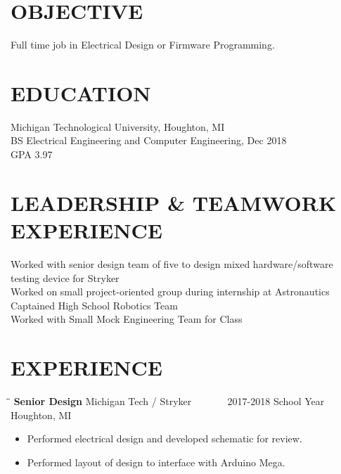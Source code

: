 \documentclass[letterpaper]{res}
\begin{document}
 


\address{\bf CONTACT \\ jaevanko@mtu.edu \\ (269) 262-6098}
\address{\bf ADDRESS \\ 14200 Stone Jug Road \\  Battle Creek, MI 49015}

\begin{resume}

  \section{OBJECTIVE}          
  Full time job in Electrical Design or Firmware Programming.

  \section{EDUCATION}          
  Michigan Technological University, Houghton, MI  \\        
  BS Electrical Engineering and Computer Engineering, Dec 2018   \\      
  GPA 3.97

  \section{LEADERSHIP \& TEAMWORK EXPERIENCE}
  Worked with senior design team of five to design mixed hardware/software testing device for Stryker \\
  Worked on small project-oriented group during internship at Astronautics \\
  Captained High School Robotics Team \\
  Worked with Small Mock Engineering Team for Class \\

  \section{EXPERIENCE}
  \vspace{-0.15in}
  \begin{tabbing}
    \hspace{2.3in}\= \hspace{2.6in}\= \kill %
    {\bf Senior Design} \>Michigan Tech / Stryker \> ~~~~~~ 2017-2018 School Year\\
    \> Houghton, MI
  \end{tabbing}\vspace{-10pt}
  \begin{itemize} \itemsep1pt \parskip0pt 
    \item Performed electrical design and developed schematic for review.
	\item Performed layout of design to interface with Arduino Mega.
  \end{itemize}
  

\end{resume}
\end{document}
